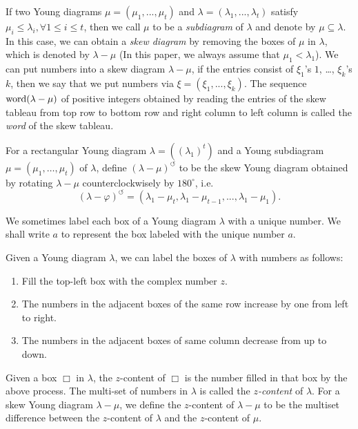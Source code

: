 \documentclass[11pt]{amsart}
\numberwithin{equation}{section}
\theoremstyle{definition}
\renewcommand{\phi}{\varphi}
\begin{document}
If two Young diagrams $\mu=(\mu_{1},...,\mu_{t})$ and $\lambda=(\lambda_{1},...,\lambda_{t})$ satisfy $\mu_{i}\leq\lambda_{i}, \forall 1\leq i\leq t$, then we call $\mu$ to be a \emph{subdiagram} of $\lambda$ and denote by $\mu\subseteq\lambda$. In this case, we can obtain a \emph{skew diagram} by removing the boxes of $\mu$ in $\lambda$, which is denoted by $\lambda-\mu$ (In this paper, we always assume that $\mu_1<\lambda_1$). We can put numbers into a skew diagram $\lambda-\mu$, if the entries consist of  $\xi_{1}$'s $1$, \ldots , $\xi_{k}$'s $k$, then we say that we put numbers via $\xi=(\xi_{1},...,\xi_{k})$.
The sequence $\textnormal{word}(\lambda-\mu)$ of positive integers obtained by reading the entries of the skew tableau from top row to bottom row and right column to left column is called the \emph{word} of the skew tableau. 

For a rectangular Young diagram $\lambda=((\lambda_1)^t)$ and a Young subdiagram $\mu=(\mu_1,\ldots, \mu_t)$ of $\lambda$, define $(\lambda-\mu)^{\circlearrowleft}$ to be the skew Young diagram obtained by rotating $\lambda-\mu$ counterclockwisely by $180^{\circ}$, i.e. 
\begin{equation} \label{eqn clockwise}
(\lambda-\phi)^{\circlearrowleft}=(\lambda_{1}-\mu_{t},\lambda_{1}-\mu_{t-1},...,\lambda_{1}-\mu_{1}) . %
\end{equation}


We sometimes label each box of a Young diagram $\lambda$ with a unique number. We shall write $\boxed{a}$ to represent the box labeled with the unique number $a$. 

Given a Young diagram $\lambda$, we can label the boxes of $\lambda$ with numbers as follows:
\begin{enumerate}
    \item Fill the top-left box with the complex number $z$.
    \item The numbers in the adjacent boxes of the same row increase by one from left to right.
    \item The numbers in the adjacent boxes of same column decrease from up to down.
\end{enumerate}
Given a box $\Box$ in $\lambda$, the $z$-content of $\Box$ is the number filled in that box by the above process.
The multi-set of numbers in $\lambda$ is called the {\it $z$-content} of $\lambda$.  For a skew Young diagram $\lambda-\mu$, we define the \(z\)-content of \(\lambda-\mu\) to be the multiset difference between the \(z\)-content of \(\lambda\) and the \(z\)-content of \(\mu \).
\end{document}
